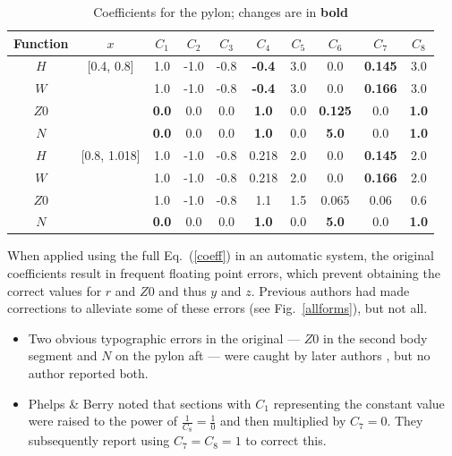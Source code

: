 \documentclass[journal]{new-aiaa}
\begin{document}
\begin{table}[!h]
\caption{Coefficients for the pylon; changes are in \textbf{bold}}
\centering
\begin{tabular}{cccccccccc}
Function & $x$ & $C_{1}$ & $C_{2}$ & $C_{3}$ & $C_{4}$ & $C_{5}$ & $C_{6}$ & $C_{7}$ & $C_{8}$ \\
\hline
$H$          & [0.4, 0.8]  & 1.0             & -1.0 & -0.8 & \textbf{-0.4} & 3.0 & 0.0                  & \textbf{0.145} & 3.0 \\
$W$          &                 & 1.0             & -1.0 & -0.8 & \textbf{-0.4} & 3.0 & 0.0                  & \textbf{0.166} & 3.0 \\
$Z0$ &                 & \textbf{0.0} & 0.0  & 0.0  & \textbf{1.0}  & 0.0  & \textbf{0.125} & 0.0                 & \textbf{1.0} \\
$N$           &                 & \textbf{0.0} & 0.0  & 0.0  & \textbf{1.0}  & 0.0  & \textbf{5.0}     & 0.0                 & \textbf{1.0} \\
\hline
$H$          & [0.8, 1.018]  & 1.0             & -1.0 & -0.8 & 0.218         & 2.0 & 0.0                 & \textbf{0.145} & 2.0 \\
$W$          &                     & 1.0             & -1.0 & -0.8 & 0.218         & 2.0 & 0.0                 & \textbf{0.166} & 2.0 \\
$Z0$ &                     & 1.0             & -1.0 & -0.8 & 1.1             & 1.5 & 0.065             & 0.06               & 0.6 \\
$N$           &                     & \textbf{0.0} & 0.0  & 0.0  & \textbf{1.0} & 0.0 & \textbf{5.0}     & 0.0                 & \textbf{1.0} \\
\end{tabular}
\label{pycoeff}
\end{table}

When applied using the full Eq.~(\ref{coeff}) in an automatic system, the original coefficients result in
frequent floating point errors, which prevent obtaining the correct values for $r$ and $Z0$ and thus $y$ and $z$.
Previous authors had made corrections to alleviate some of these errors (see Fig.~\ref{allforms}), but not all.
\begin{itemize}
\item Two obvious typographic errors in the original \cite{nasa80051} --- $Z0$ in the second body segment and $N$
on the pylon aft --- were caught by later authors \cite{nasa87762,mineckgorton}, but no author reported both.
\item Phelps \& Berry \cite{nasa87762} noted that sections with $C_1$ representing the constant value were raised
to the power of $\frac{1}{C_8} = \frac{1}{0}$ and then multiplied by $C_7 = 0$. They subsequently report using
$C_7 = C_8 = 1$ to correct this.
\end{itemize}
\end{document}

